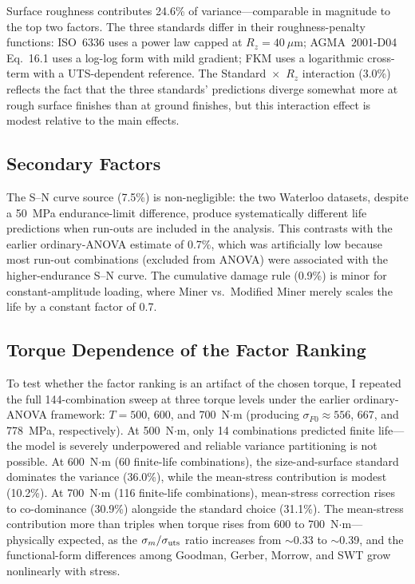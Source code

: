 \documentclass[12pt,a4paper]{article}
\begin{document}
Surface roughness contributes 24.6\% of variance---comparable in magnitude
to the top two factors. The three standards differ in their
roughness-penalty functions: ISO~6336 uses a power law capped at
$R_z=40~\mu$m; AGMA~2001-D04 Eq.~16.1 uses a log-log form with mild
gradient; FKM uses a logarithmic cross-term with a UTS-dependent
reference. The Standard~$\times$~$R_z$ interaction (3.0\%) reflects the
fact that the three standards' predictions diverge somewhat more at rough
surface finishes than at ground finishes, but this interaction effect is
modest relative to the main effects.

\subsection{Secondary Factors}

The S--N curve source (7.5\%) is non-negligible: the two Waterloo
datasets, despite a 50~MPa endurance-limit difference, produce
systematically different life predictions when run-outs are included
in the analysis. This contrasts with the earlier ordinary-ANOVA
estimate of 0.7\%, which was artificially low because most run-out
combinations (excluded from ANOVA) were associated with the
higher-endurance S--N curve. The cumulative damage rule (0.9\%) is
minor for constant-amplitude loading, where Miner vs.\ Modified
Miner merely scales the life by a constant factor of 0.7.

\subsection{Torque Dependence of the Factor Ranking}
\label{sec:torque}


To test whether the factor ranking is an artifact of the chosen torque,
I repeated the full 144-combination sweep at three torque levels under the
earlier ordinary-ANOVA framework:
$T = 500$, 600, and 700~N$\cdot$m (producing $\sigma_{F0} \approx 556$,
667, and 778~MPa, respectively). At 500~N$\cdot$m, only 14 combinations
predicted finite life---the model is severely underpowered and reliable
variance partitioning is not possible. At 600~N$\cdot$m (60 finite-life
combinations), the size-and-surface standard dominates the variance
(36.0\%), while the mean-stress contribution is modest (10.2\%). At
700~N$\cdot$m (116 finite-life combinations), mean-stress correction
rises to co-dominance (30.9\%) alongside the standard choice (31.1\%).
The mean-stress contribution more than triples when torque rises from
600 to 700~N$\cdot$m---physically expected, as the
$\sigma_m/\sigma_{\rm uts}$ ratio increases from $\sim$0.33 to
$\sim$0.39, and the functional-form differences among Goodman, Gerber,
Morrow, and SWT grow nonlinearly with stress.
\end{document}
